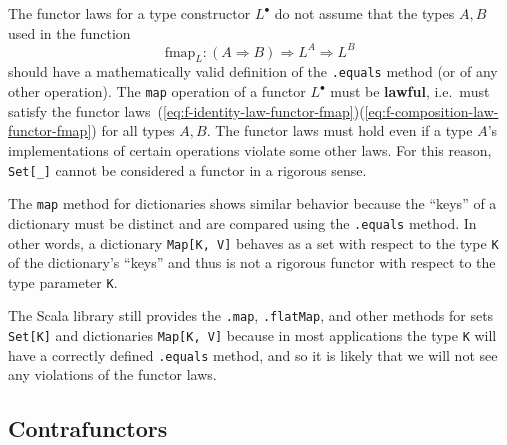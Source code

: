 The functor laws for a type constructor $L^{\bullet}$ do not assume
that the types $A,B$ used in the function
\[
\text{fmap}_{L}:\left(A\Rightarrow B\right)\Rightarrow L^{A}\Rightarrow L^{B}
\]
should have a mathematically valid definition of the \lstinline!.equals!
method (or of any other operation). The \lstinline!map! operation
of a functor $L^{\bullet}$ must be \textbf{lawful},
i.e.~must satisfy the functor laws~(\ref{eq:f-identity-law-functor-fmap})\textendash (\ref{eq:f-composition-law-functor-fmap})
for all types $A,B$. The functor laws must hold even if a type $A$'s
implementations of certain operations violate some other laws. For
this reason, \lstinline!Set[_]! cannot be considered a functor in
a rigorous sense.

The \lstinline!map! method for dictionaries shows similar behavior
because the ``keys'' of a dictionary must be distinct and are compared
using the \lstinline!.equals! method. In other words, a dictionary
\lstinline!Map[K, V]! behaves as a set with respect to the type \lstinline!K!
of the dictionary's ``keys'' and thus is not a rigorous functor
with respect to the type parameter \lstinline!K!.

The Scala library still provides the \lstinline!.map!, \lstinline!.flatMap!,
and other methods for sets \lstinline!Set[K]! and dictionaries \lstinline!Map[K, V]!
because in most applications the type \lstinline!K! will have a correctly
defined \lstinline!.equals! method, and so it is likely that we will
not see any violations of the functor laws.

\subsection{Contrafunctors}

